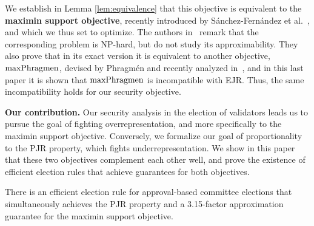 We establish in Lemma \ref{lem:equivalence} that this objective is equivalent to the \textbf{maximin support objective}, recently introduced by Sánchez-Fernández et al.~\cite{sanchez2016maximin}, and which we thus set to optimize. 
The authors in~\cite{sanchez2016maximin} remark that the corresponding problem is NP-hard, but do not study its approximability. They also prove that in its exact version it is equivalent to another objective, $\operatorname{maxPhragmen}$, devised by Phragm\'{e}n and recently analyzed in~\cite{brill2017phragmen}, and in this last paper it is shown that $\operatorname{maxPhragmen}$ is incompatible with EJR. Thus, the same incompatibility holds for our security objective. 

\textbf{Our contribution.}
Our security analysis in the election of validators leads us to pursue the goal of fighting overrepresentation, and more specifically to the maximin support objective.  
Conversely, we formalize our goal of proportionality to the PJR property, which fights underrepresentation. 
We show in this paper that these two objectives complement each other well, and prove the existence of efficient election rules that achieve guarantees for both objectives. 

\begin{theorem}\label{thm:intro1}
There is an efficient election rule for approval-based committee elections that simultaneously achieves the PJR property and a 3.15-factor approximation guarantee for the maximin support objective.
\end{theorem}

